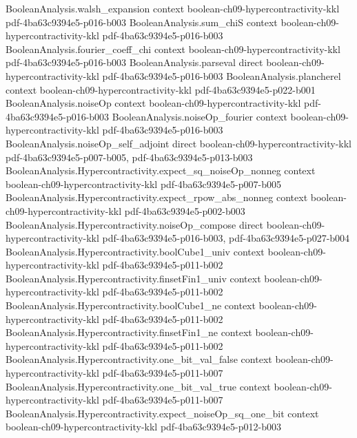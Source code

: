 \begin{theorem}
\proofstep
  {BooleanAnalysis.walsh_expansion}
  {context}
  {boolean-ch09-hypercontractivity-kkl}
  {pdf-4ba63c9394e5-p016-b003}
\proofstep
  {BooleanAnalysis.sum_chiS}
  {context}
  {boolean-ch09-hypercontractivity-kkl}
  {pdf-4ba63c9394e5-p016-b003}
\proofstep
  {BooleanAnalysis.fourier_coeff_chi}
  {context}
  {boolean-ch09-hypercontractivity-kkl}
  {pdf-4ba63c9394e5-p016-b003}
\proofstep
  {BooleanAnalysis.parseval}
  {direct}
  {boolean-ch09-hypercontractivity-kkl}
  {pdf-4ba63c9394e5-p016-b003}
\proofstep
  {BooleanAnalysis.plancherel}
  {context}
  {boolean-ch09-hypercontractivity-kkl}
  {pdf-4ba63c9394e5-p022-b001}
\proofstep
  {BooleanAnalysis.noiseOp}
  {context}
  {boolean-ch09-hypercontractivity-kkl}
  {pdf-4ba63c9394e5-p016-b003}
\proofstep
  {BooleanAnalysis.noiseOp_fourier}
  {context}
  {boolean-ch09-hypercontractivity-kkl}
  {pdf-4ba63c9394e5-p016-b003}
\proofstep
  {BooleanAnalysis.noiseOp_self_adjoint}
  {direct}
  {boolean-ch09-hypercontractivity-kkl}
  {pdf-4ba63c9394e5-p007-b005,
    pdf-4ba63c9394e5-p013-b003}
\proofstep
  {BooleanAnalysis.Hypercontractivity.expect_sq_noiseOp_nonneg}
  {context}
  {boolean-ch09-hypercontractivity-kkl}
  {pdf-4ba63c9394e5-p007-b005}
\proofstep
  {BooleanAnalysis.Hypercontractivity.expect_rpow_abs_nonneg}
  {context}
  {boolean-ch09-hypercontractivity-kkl}
  {pdf-4ba63c9394e5-p002-b003}
\proofstep
  {BooleanAnalysis.Hypercontractivity.noiseOp_compose}
  {direct}
  {boolean-ch09-hypercontractivity-kkl}
  {pdf-4ba63c9394e5-p016-b003,
    pdf-4ba63c9394e5-p027-b004}
\proofstep
  {BooleanAnalysis.Hypercontractivity.boolCube1_univ}
  {context}
  {boolean-ch09-hypercontractivity-kkl}
  {pdf-4ba63c9394e5-p011-b002}
\proofstep
  {BooleanAnalysis.Hypercontractivity.finsetFin1_univ}
  {context}
  {boolean-ch09-hypercontractivity-kkl}
  {pdf-4ba63c9394e5-p011-b002}
\proofstep
  {BooleanAnalysis.Hypercontractivity.boolCube1_ne}
  {context}
  {boolean-ch09-hypercontractivity-kkl}
  {pdf-4ba63c9394e5-p011-b002}
\proofstep
  {BooleanAnalysis.Hypercontractivity.finsetFin1_ne}
  {context}
  {boolean-ch09-hypercontractivity-kkl}
  {pdf-4ba63c9394e5-p011-b002}
\proofstep
  {BooleanAnalysis.Hypercontractivity.one_bit_val_false}
  {context}
  {boolean-ch09-hypercontractivity-kkl}
  {pdf-4ba63c9394e5-p011-b007}
\proofstep
  {BooleanAnalysis.Hypercontractivity.one_bit_val_true}
  {context}
  {boolean-ch09-hypercontractivity-kkl}
  {pdf-4ba63c9394e5-p011-b007}
\proofstep
  {BooleanAnalysis.Hypercontractivity.expect_noiseOp_sq_one_bit}
  {context}
  {boolean-ch09-hypercontractivity-kkl}
  {pdf-4ba63c9394e5-p012-b003}
\proofstep

\end{theorem}

